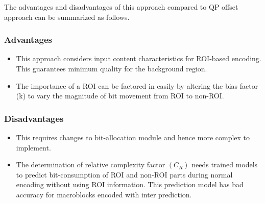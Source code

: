 \documentclass[11pt]{article} %
\begin{document}
The advantages and disadvantages of this approach compared to QP offset approach can be summarized as follows.
\subsubsection*{Advantages}
\begin{itemize}
\item This approach considers input content characteristics for ROI-based encoding. This guarantees minimum quality for the background region.
\item The importance of a ROI can be factored in easily by altering the bias factor (k) to vary the magnitude of bit movement from ROI to non-ROI.
\end{itemize}

\subsubsection*{Disadvantages}
\begin{itemize}
\item This requires changes to bit-allocation module and hence more complex to implement.
\item The determination of relative complexity factor $(C_R)$ needs trained models to predict bit-consumption of ROI and non-ROI parts during normal encoding without using ROI information. This prediction model has bad accuracy for macroblocks encoded with inter prediction. 
\end{itemize}
%
%
%
%
%
\clearpage
\end{document}
